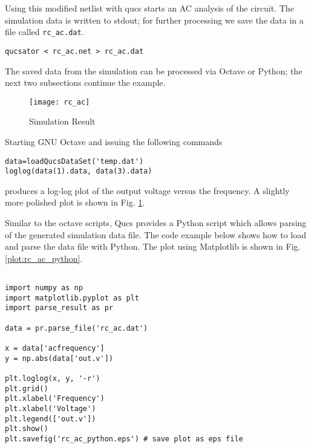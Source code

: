 Using this modified netlist with qucs starts an AC analysis of the circuit. The simulation data is written to stdout; for further processing we save the data in a file called \verb+rc_ac.dat+.

\begin{verbatim}
qucsator < rc_ac.net > rc_ac.dat
\end{verbatim}

The saved data from the simulation can be processed via Octave or Python; the next two subsections continue the example.

\begin{figure}[htb]
\begin{center}
  \texttt{[image: rc\_ac]}
  \caption{Simulation Result}
  \label{plot:rc_ac_octave}
\end{center}
\end{figure}





Starting GNU Octave and issuing the following commands

\begin{verbatim}
data=loadQucsDataSet('temp.dat')
loglog(data(1).data, data(3).data)
\end{verbatim}

produces a log-log plot of the output voltage versus the frequency. A slightly more polished plot is shown in Fig. \ref{plot:rc_ac_octave}.



Similar to the octave scripts, Qucs provides a Python script which allows parsing of the generated simulation data file. The code example below shows how to load and parse the data file with Python. The plot using Matplotlib is shown in Fig. \ref{plot:rc_ac_python}.

\begin{verbatim}

import numpy as np
import matplotlib.pyplot as plt
import parse_result as pr

data = pr.parse_file('rc_ac.dat')

x = data['acfrequency']
y = np.abs(data['out.v'])

plt.loglog(x, y, '-r')
plt.grid()
plt.xlabel('Frequency')
plt.xlabel('Voltage')
plt.legend(['out.v'])
plt.show()
plt.savefig('rc_ac_python.eps') # save plot as eps file

\end{verbatim}


